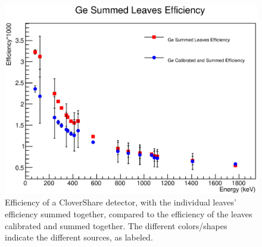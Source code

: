 \begin{figure}[hbt!]
    \centering
    \includegraphics[scale=0.7]{Setup_Figs/Efficiency_ind_vs_sum.eps}
    \caption{Efficiency of a CloverShare detector, with the individual leaves' efficiency summed together, compared to the efficiency of the leaves calibrated and summed together. The different colors/shapes indicate the different sources, as labeled.}
    \label{fig:Clover_ind_vs_sum}
\end{figure}